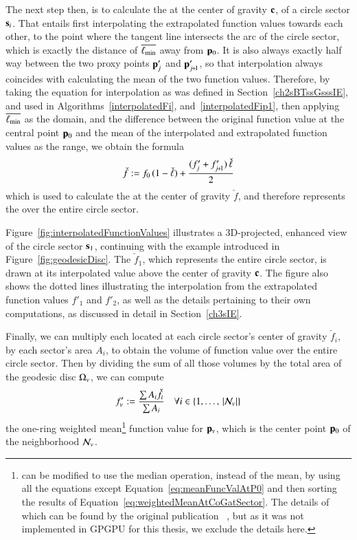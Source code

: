 The next step then, is to calculate the \wmfv{} at the center of gravity $\mathbf{c}$, of a circle sector $\mathbf{s}_i$. That entails first interpolating the extrapolated function values towards each other, to the point where the tangent line intersects the arc of the circle sector, which is exactly the distance of $\overline{\ell_\text{min}}$ away from $\mathbf{p}_0$. It is also always exactly half way between the two proxy points $\mathbf{p}'_j$ and $\bp'_{\sjpo}$, so that interpolation always coincides with calculating the mean of the two function values. Therefore, by taking the equation for interpolation as was defined in Section~\ref{ch2sBTssGsssIE}, and used in Algorithms~\ref{interpolatedFi}, and~\ref{interpolatedFip1}, then applying $\overline{\ell_\text{min}}$ as the domain, and the difference between the original function value at the central point $\mathbf{p}_0$ and the mean of the interpolated and extrapolated function values as the range, we obtain the formula
%
\begin{equation}
	\check{f} := f_0\,(1 - \check{\ell}) + \frac{(f'_j + f'_{\sjpo})\,\check{\ell}}{2}
	\label{eq:weightedMeanAtCoGatSector}
\end{equation}%
%
which is used to calculate the \wmfv{} at the center of gravity $\check{f}$, and therefore represents the \wmfv{} over the entire circle sector.

Figure~\ref{fig:interpolatedFunctionValues} illustrates a 3D-projected, enhanced view of the circle sector $\mathbf{s}_1$, continuing with the example introduced in Figure~\ref{fig:geodesicDisc}. The \wmfv{} $\check{f}_1$, which represents the entire circle sector, is drawn at its interpolated value above the center of gravity $\mathbf{c}$. The figure also shows the dotted lines illustrating the interpolation from the extrapolated function values $f'_1$ and $f'_2$, as well as the details pertaining to their own computations, as discussed in detail in Section~\ref{ch3sIE}.

Finally, we can multiply each \wmfv{} located at each circle sector's center of gravity $\check{f}_i$, by each sector's area $A_i$, to obtain the volume of function value over the entire circle sector. Then by dividing the sum of all those volumes by the total area of the geodesic disc $\Omega_v$, we can compute
%
\begin{equation}
	f'_v := \frac{\sum A_i\check{f}_i}{\sum A_i} \quad \forall i \in \{1,\ldots,\,|\mathcal{N}_v|\}
	\label{eq:meanFuncValAtPv}
\end{equation}%
%
the one-ring weighted mean\footnote{ can be modified to use the median operation, instead of the mean, by using all the equations except Equation~\ref{eq:meanFuncValAtP0} and then sorting the results of Equation~\ref{eq:weightedMeanAtCoGatSector}. The details of which can be found by the original publication ~\cite[s.~3.2]{Mara17}, but as it was not implemented in GPGPU for this thesis, we exclude the details here.} function value for $\mathbf{p}_v$, which is the center point $\mathbf{p}_0$ of the neighborhood $\mathcal{N}_v$.

